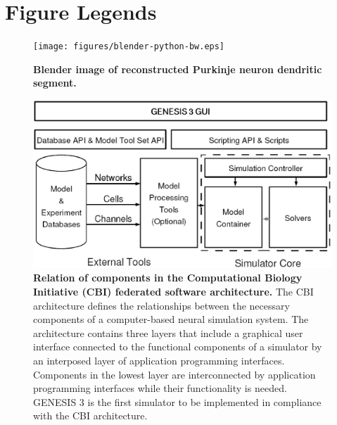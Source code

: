 \documentclass[10pt]{article}
\begin{document}
\newpage

\section*{Figure Legends}

\begin{figure}[ht]
\centering
\texttt{[image: figures/blender-python-bw.eps]}
\caption{
{\bf Blender image of reconstructed Purkinje neuron dendritic segment.}
}
\label{fig:cbi-blender}
\end{figure}

\begin{figure}[ht]
\centering
\includegraphics[scale=0.5]{figures/G3arch.eps}
\caption{
{\bf Relation of components in the Computational Biology Initiative (CBI) federated software architecture.} The CBI architecture defines the relationships between the necessary components of a computer-based neural simulation system. The architecture contains three layers that include a graphical user interface connected to the functional components of a simulator by an interposed layer of application programming interfaces. Components in the lowest layer are interconnected by application programming interfaces while their functionality is needed. GENESIS 3 is the first simulator to be implemented in compliance with the CBI architecture.
}
\label{fig:cbi-arch}
\end{figure}

\clearpage

\end{document}
